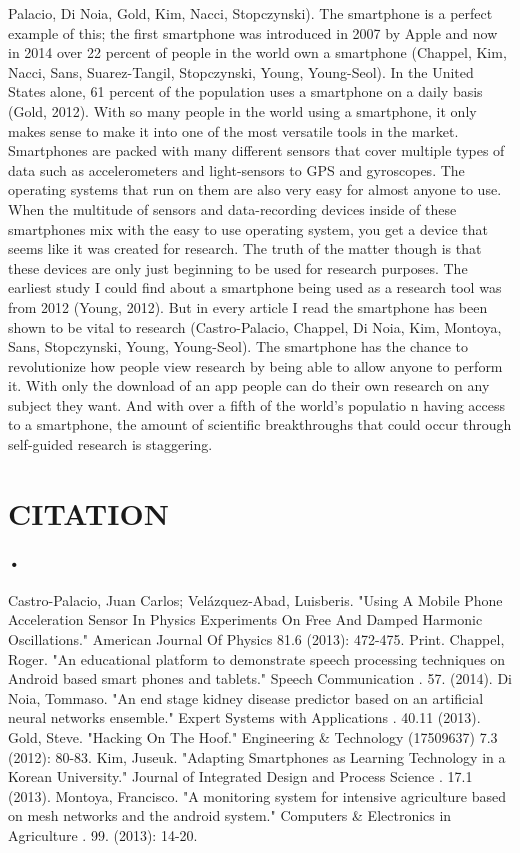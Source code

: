 \documentclass{article}
\begin{document}
Palacio, Di Noia, Gold, Kim, Nacci, Stopczynski). The smartphone is a perfect example of this; the first smartphone was introduced in 2007 by Apple and now in 2014 over 22 percent of people in the world own a smartphone (Chappel, Kim, Nacci, Sans, Suarez-Tangil, Stopczynski, Young, Young-Seol). In the United States alone, 61 percent of the population uses a smartphone on a daily  basis (Gold, 2012). With so many people in the world using a smartphone, it only makes sense to make it into one of the most versatile tools in the market. Smartphones are packed with many different sensors that cover multiple types of data such as accelerometers and light-sensors to GPS and gyroscopes. The operating systems that run on them are also very easy for almost anyone to use. When the multitude of sensors and data-recording devices inside of these smartphones mix with the easy to use operating system, you get a device that seems like it was created for research. The truth of the matter though is that these devices are only just beginning to be used for research purposes. The earliest study I could find about a smartphone being used as a research tool was from 2012 (Young, 2012). But in every article I read the smartphone has been shown to be vital to research (Castro-Palacio, Chappel, Di Noia, Kim, Montoya, Sans, Stopczynski, Young, Young-Seol). The smartphone has the chance to revolutionize how people view research by being able to allow anyone to perform it. With only the download of an app people can do their own
research on any subject they want. And with over a fifth of the world’s populatio
n having access to a smartphone, the amount of scientific breakthroughs that could occur through self-guided research is staggering.
\newpage
\section{CITATION}
\paragraph{•}
Castro-Palacio, Juan Carlos; Velázquez-Abad, Luisberis. "Using A Mobile Phone Acceleration Sensor In Physics Experiments On Free And Damped Harmonic Oscillations."
 American  Journal Of Physics
 81.6 (2013): 472-475. Print. Chappel, Roger. "An educational platform to demonstrate speech processing techniques on Android based smart phones and tablets."
Speech Communication
. 57. (2014). Di Noia, Tommaso. "An end stage kidney disease predictor based on an artificial neural networks ensemble."
 Expert Systems with Applications
. 40.11 (2013). Gold, Steve. "Hacking On The Hoof."
Engineering \& Technology (17509637)
 7.3 (2012): 80-83. Kim, Juseuk. "Adapting Smartphones as Learning Technology in a Korean University."
 Journal of Integrated Design and Process Science
. 17.1 (2013). Montoya, Francisco. "A monitoring system for intensive agriculture based on mesh networks and the android system."
Computers \& Electronics in Agriculture
. 99. (2013): 14-20.
\end{document}
